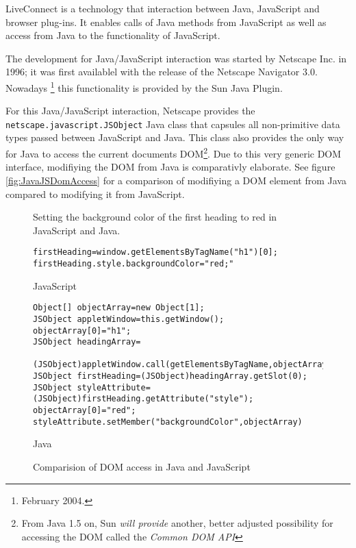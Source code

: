 LiveConnect is a technology that interaction between Java, JavaScript and browser plug-ins. It enables calls of Java methods from JavaScript as well as access from Java to the functionality of JavaScript.

The development for Java/JavaScript interaction was started by Netscape Inc. in 1996; it was first availablel with the release of the Netscape Navigator 3.0. Nowadays \footnote{February 2004.} this functionality is provided by the Sun Java Plugin.

For this Java/JavaScript interaction, Netscape provides the \texttt{netscape.javascript.JSObject} Java class that capsules all non-primitive data types passed between JavaScript and Java. This class also provides the only way for Java to access the current documents DOM\footnote{From Java 1.5 on, Sun \emph{will provide} another, better adjusted possibility for accessing the DOM called the \emph{Common DOM API}}. Due to this very generic DOM interface, modifiying the DOM from Java is comparativly elaborate. See figure \ref{fig:JavaJSDomAccess} for a comparison of modifiying a DOM element from Java compared to modifying it from JavaScript.

\begin{figure}[htbp]
Setting the background color of the first heading to red in JavaScript and Java.	
\begin{verbatim}
firstHeading=window.getElementsByTagName("h1")[0];
firstHeading.style.backgroundColor="red;"
\end{verbatim}
JavaScript

\begin{verbatim}
Object[] objectArray=new Object[1];
JSObject appletWindow=this.getWindow();
objectArray[0]="h1";
JSObject headingArray=
  (JSObject)appletWindow.call(getElementsByTagName,objectArray);
JSObject firstHeading=(JSObject)headingArray.getSlot(0);
JSObject styleAttribute=(JSObject)firstHeading.getAttribute("style");
objectArray[0]="red";
styleAttribute.setMember("backgroundColor",objectArray)
\end{verbatim}
Java

	\caption{Comparision of DOM access in Java and JavaScript}
	\label{fig:ComparisionOfDOMAccessInJavaAndJavaScript}
\end{figure}